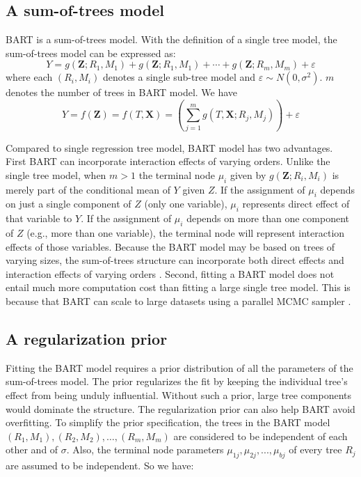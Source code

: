 \subsection{A sum-of-trees model}
BART is a sum-of-trees model. With the definition of a single tree model, the sum-of-trees model can be expressed as:
\begin{equation*}
Y = g(\pmb{Z};{R_1},{M_1}) + g(\pmb{Z};{R_1},{M_1}) +  \cdots  + g(\pmb{Z};{R_m},{M_m}) + \varepsilon
\end{equation*}
where each $(R_i,M_i)$ denotes a single sub-tree model and $\varepsilon  \sim N(0,{\sigma ^2})$.  $m$ denotes the number of trees in BART model. We have
 \begin{equation*}
 Y =f(\pmb{Z})=f(T,\pmb{X})= \left( {\sum\limits_{j = 1}^m {g(T,\pmb{X};{R_j},{M_j})} } \right) + \varepsilon
 \end{equation*}

Compared to single regression tree model, BART model has two advantages. First BART can incorporate interaction effects of varying orders. Unlike the single tree model, when $m>1$ the terminal node $\mu_i$ given by $g(\pmb{Z};{R_i},{M_i})$ is merely part of the conditional mean of $Y$ given $Z$. If the assignment of $\mu_i$ depends on just a single component of $Z$ (only one variable),  $\mu_i$  represents direct effect of that variable to $Y$. If the assignment of $\mu_i$ depends on more than one component of $Z$ (e.g., more than one variable), the terminal node will represent interaction effects of those variables. Because the BART model may be based on trees of varying sizes, the sum-of-trees structure can incorporate both direct effects and interaction effects of varying orders \cite{conference1997advances}. Second, fitting a BART model does not entail much more computation cost than fitting a large single tree model. This is because that BART can scale to large datasets using a parallel MCMC sampler \cite{pratola2014parallel, pratola2015bayesian}.  

\subsection{A regularization prior}
Fitting the BART model requires a prior distribution of all the parameters of the sum-of-trees model.  The prior regularizes the fit by keeping the individual tree's effect from being unduly influential. Without such a prior, large tree components would dominate the structure. The regularization prior can also help BART avoid overfitting. To simplify the prior specification, the trees in the BART model $(R_1, M_1), (R_2,M_2), \ldots, (R_m, M_m) $ are considered to be independent of each other and of $\sigma$. Also, the terminal node parameters $ \mu _{1j}, \mu _{2j}, . . ., \mu _{bj} $ of every tree $R_j$ are assumed to be independent. So we have:

